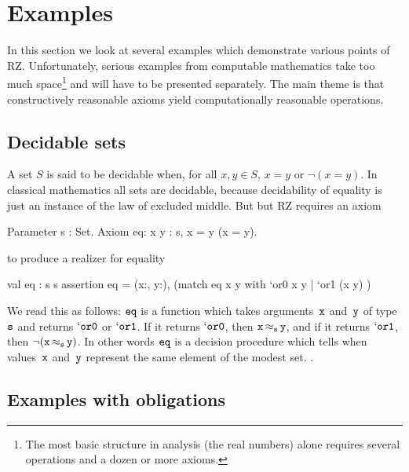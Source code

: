 \section{Examples}
\label{sec:examples}

In this section we look at several examples which demonstrate various
points of RZ. Unfortunately, serious examples from computable
mathematics take too much space\footnote{The most basic structure
  in analysis (the real numbers) alone 
  requires several operations and a dozen or more axioms.} and will have to
be presented separately. The main theme is that constructively
reasonable axioms yield computationally reasonable operations.

\subsection{Decidable sets}
\label{sec:decidable-sets}

A set $S$ is said to be decidable when, for all $x, y \in S$, $x = y$
or $\lnot (x = y)$. In classical mathematics all sets are decidable, 
\iflong
because decidability of equality is just an instance of the law of
excluded middle.  But
\else
but
\fi %
RZ requires an axiom
%
\begin{source}
Parameter s : Set.
Axiom eq: \iForall x y : s, x = y \iOr \iNot (x = y).
\end{source}
%
to produce a realizer for equality
%
\begin{source}
val eq : s \iTo s \iTo [`or0 | `or1]
assertion eq = \iForall (x:, y:),
                   (match eq x y with
                      `or0 \iImply x  y
                    | `or1 \iImply \iNot (x  y) )
\end{source}
%
We read this as follows: $\f{eq}$ is a function which takes
arguments~$\f{x}$ and~$\f{y}$ of type~$\f{s}$ and returns
$\mathtt{`or0}$ or $\mathtt{`or1}$. If it returns $\mathtt{`or0}$,
then $\oper{\f{s}}{\f{x}}{\f{y}}$, and if it returns
$\mathtt{`or1}$, then $\onot{(\oper{\f{s}}{\f{x}}{\f{y}})}$. In
other words $\f{eq}$ is a decision procedure%
\iflong
which tells when
values~$\f{x}$ and~$\f{y}$ represent the same element of the modest
set.
\else %
.
\fi %

\iflong
\subsection{Examples with obligations}
\label{sec:exampl-with-oblig}

